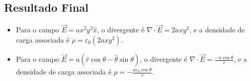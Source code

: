 \documentclass[a4paper,12pt]{article}
\newcommand{\printingbibliography}{%

    \pagestyle{myheadings}
    \markright{}
    \sloppy
    \printbibliography[heading=bibintoc, %
                   title=Refer\^encias %
                  ]
    \fussy%
}
\begin{document}
\begin{flushleft}
\section*{Resultado Final}

\begin{itemize}
\item Para o campo \( \vec{E} = a x^2 y^2 \hat{x} \), o divergente é \( \nabla \cdot \vec{E} = 2a x y^2 \), e a 
densidade de carga associada é \( \rho = \varepsilon_0 (2a x y^2) \).

\item Para o campo \( \vec{E} = a ( \hat{r} \cos \theta - \hat{\theta} \sin \theta ) \), o divergente 
é \( \nabla \cdot \vec{E} = \frac{-a \cos \theta}{r} \), e a densidade de carga associada 
é \( \rho = -\frac{a \varepsilon_0 \cos \theta}{r} \).
\end{itemize}

\end{flushleft}



\end{document}
